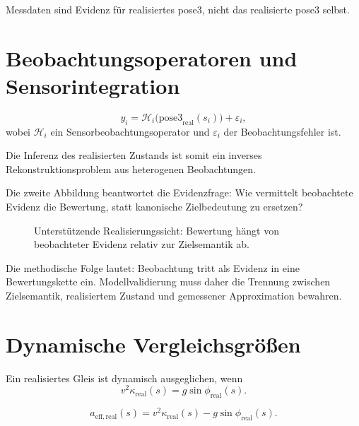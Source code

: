 \begin{principle}
\label{princ:measured-state-ambiguity}
Messdaten sind Evidenz für realisiertes pose3, nicht das realisierte pose3
selbst.
\end{principle}

\section{Beobachtungsoperatoren und Sensorintegration}

\begin{definition}[Sensorbeobachtungsmodell]
\label{def:sensor-observation-model}
\[
y_i
=
\mathcal H_i\bigl(\mathrm{pose3}_{\mathrm{real}}(s_i)\bigr)
+
\varepsilon_i,
\]
wobei \(\mathcal H_i\) ein Sensorbeobachtungsoperator und
\(\varepsilon_i\) der Beobachtungsfehler ist.
\end{definition}

Die Inferenz des realisierten Zustands ist somit ein inverses
Rekonstruktionsproblem aus heterogenen Beobachtungen.

Die zweite Abbildung beantwortet die Evidenzfrage: Wie vermittelt beobachtete
Evidenz die Bewertung, statt kanonische Zielbedeutung zu ersetzen?

\begin{figure}[ht]
\centering

\caption{Unterstützende Realisierungssicht: Bewertung hängt von beobachteter Evidenz relativ zur Zielsemantik ab.}
\label{fig:support-target-observed-assessment}
\end{figure}

Die methodische Folge lautet: Beobachtung tritt als Evidenz in eine
Bewertungskette ein. Modellvalidierung muss daher die Trennung zwischen
Zielsemantik, realisiertem Zustand und gemessener Approximation bewahren.

\section{Dynamische Vergleichsgrößen}

\begin{definition}
\label{def:realized-equilibrium-condition}
Ein realisiertes Gleis ist dynamisch ausgeglichen, wenn
\[
v^2\kappa_{\mathrm{real}}(s)=g\sin\phi_{\mathrm{real}}(s).
\]
\end{definition}

\begin{definition}
\label{def:realized-effective-lateral-acceleration}
\[
a_{\mathrm{eff,real}}(s)
=
v^2\kappa_{\mathrm{real}}(s)-g\sin\phi_{\mathrm{real}}(s).
\]
\end{definition}

